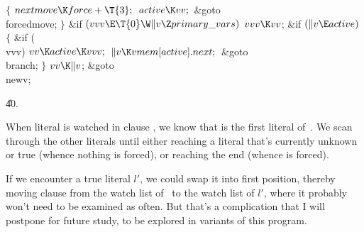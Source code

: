 ${}\{{}$\1\6
${}\\{nextmove}\K\\{force}+\T{3};{}$\6
${}\\{active}\K\\{vv};{}$\6
\&{goto} \\{forcedmove};\6
\4${}\}{}$\2\6
\&{if} ${}(\\{vvv}\E\T{0}\W\|v\Z\\{primary\_vars}){}$\1\5
${}\\{vvv}\K\\{vv}{}$;\2\6
\&{if} ${}(\|v\E\\{active}){}$\5
${}\{{}$\1\6
\&{if} (\\{vvv})\1\5
${}\\{vv}\K\\{active}\K\\{vvv};{}$\2\6
${}\|v\K\\{vmem}[\\{active}].\\{next};{}$\6
\&{goto} \\{branch};\6
\4${}\}{}$\2\6
${}\\{vv}\K\|v{}$;\5
\&{goto} \\{newv};\par
\U40.\fi

When literal  is watched in clause , we know
that  is the first
literal of~. We scan through the other literals until either
reaching a literal that's currently unknown or true (whence nothing
is forced), or reaching the end (whence  is forced).

If we encounter a true literal $l'$, we could swap it into first position,
thereby moving clause  from the watch list of~ to the watch
list
of $l'$, where it probably won't need to be examined as often.
But that's a complication that I will postpone for future study,
to be explored in variants of this program.

